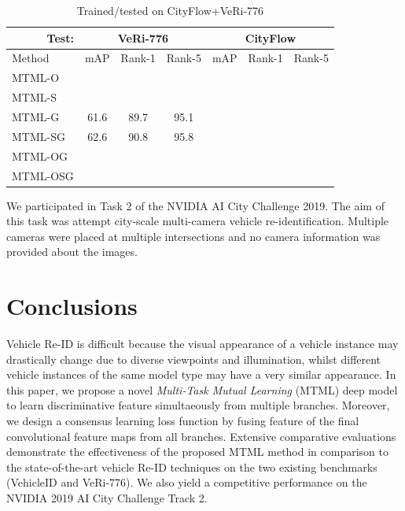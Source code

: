 \documentclass[10pt,twocolumn,letterpaper]{article}
\begin{document}
\begin{table}[h]
  \centering
  \setlength{\tabcolsep}{0.05cm}
  \begin{tabular}{l|c|c|c|c|c|c}
  \hline
  \multicolumn{1}{r|}{Test:} & \multicolumn{3}{c|}{VeRi-776} & \multicolumn{3}{c}{CityFlow} \\
  \hline
  Method       & mAP   & Rank-1  & Rank-5  & mAP   & Rank-1 & Rank-5  \\
  \hline
  MTML-O       &       &         &         &       &        &         \\
  MTML-S       &       &         &         &       &        &         \\
  MTML-G       & 61.6  & 89.7    & 95.1    &       &        &         \\
  MTML-SG      & 62.6  & 90.8    & 95.8    &       &        &         \\
  MTML-OG      &       &         &         &       &        &         \\
  MTML-OSG     &       &         &         &       &        &      \\
  \hline
  \end{tabular}
  \caption{Trained/tested on CityFlow+VeRi-776}
  \label{T:cf_veri_res}
\end{table}

We participated in Task 2 of the NVIDIA AI City Challenge 2019. The aim of this task was attempt city-scale multi-camera vehicle re-identification. Multiple cameras were placed at multiple intersections and no camera information was provided about the images.

%

\section{Conclusions}
Vehicle Re-ID is difficult because the visual appearance of
a vehicle instance may drastically change due to diverse
viewpoints and illumination, whilst different vehicle instances of the same
model type may have a very similar appearance.
%
In this paper, we propose a novel {\em Multi-Task Mutual Learning} (MTML) deep model
to learn discriminative feature simultaeously from multiple branches.
%
Moreover, we design a consensus learning loss function by fusing feature of the final convolutional feature maps from all branches.
%
Extensive comparative evaluations demonstrate the effectiveness of the
proposed MTML method in comparison to the state-of-the-art vehicle Re-ID techniques on the two existing benchmarks
(VehicleID and VeRi-776).
We also yield a competitive performance on the NVIDIA 2019 AI City Challenge Track 2.

{\small


}
\end{document}
